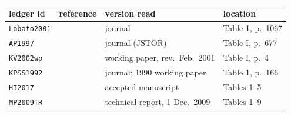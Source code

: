 \begin{tabular}{@{}llll@{}}\toprule
ledger id & reference & version read & location\\\midrule
\texttt{Lobato2001} & \citet{Lob01} & journal & Table 1, p.~1067\\
\texttt{AP1997} & \citet{AP97} & journal (JSTOR) & Table I, p.~677\\
\texttt{KV2002wp} & \citet{KV02} & working paper, rev.\ Feb.\ 2001 & Table I, p.~4\\
\texttt{KPSS1992} & \citet{KPSS92} & journal; 1990 working paper & Table 1, p.~166\\
\texttt{HI2017} & \citet{HI17} & accepted manuscript & Tables 1--5\\
\texttt{MP2009TR} & \citet{MP09} & technical report, 1 Dec.\ 2009 & Tables 1--9\\
\bottomrule\end{tabular}
